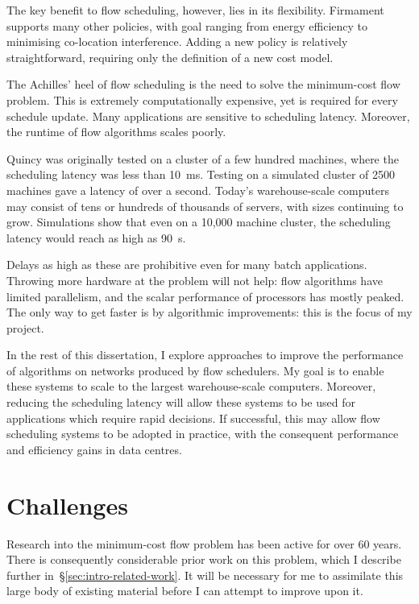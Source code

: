 The key benefit to flow scheduling, however, lies in its flexibility. Firmament supports many other policies, with goal ranging from energy efficiency to minimising co-location interference. Adding a new policy is relatively straightforward, requiring only the definition of a new cost model.

The Achilles' heel of flow scheduling is the need to solve the minimum-cost flow problem. This is extremely computationally expensive, yet is required for every schedule update. Many applications are sensitive to scheduling latency. Moreover, the runtime of flow algorithms scales poorly. 

Quincy was originally tested on a cluster of a few hundred machines, where the scheduling latency was less than \SI{10}{\milli\second}. Testing on a simulated cluster of 2500 machines gave a latency of over a second. Today's warehouse-scale computers may consist of tens or hundreds of thousands of servers, with sizes continuing to grow. Simulations show that even on a 10,000 machine cluster, the scheduling latency would reach as high as \SI{90}{\second}.

Delays as high as these are prohibitive even for many batch applications. Throwing more hardware at the problem will not help: flow algorithms have limited parallelism, and the scalar performance of processors has mostly peaked. The only way to get faster is by algorithmic improvements: this is the focus of my project.

In the rest of this dissertation, I explore approaches to improve the performance of algorithms on networks produced by flow schedulers. My goal is to enable these systems to scale to the largest warehouse-scale computers. Moreover, reducing the scheduling latency will allow these systems to be used for applications which require rapid decisions. If successful, this may allow flow scheduling systems to be adopted in practice, with the consequent performance and efficiency gains in data centres.

\section{Challenges} \label{sec:intro-challenges}
Research into the minimum-cost flow problem has been active for over 60 years. There is consequently considerable prior work on this problem, which I describe further in~\S\ref{sec:intro-related-work}. It will be necessary for me to assimilate this large body of existing material before I can attempt to improve upon it.

